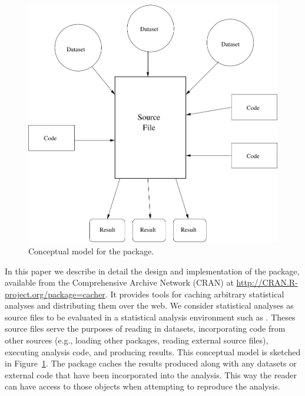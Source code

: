\documentclass[nojss]{jss}
\begin{document}
\begin{figure}[t!]
  \centering
\includegraphics[width=4.8in]{model}
\caption{Conceptual model for the  package.}
\label{model}
\end{figure}

In this paper we describe in detail the design and implementation of
the  package, available from the Comprehensive 
Archive Network (CRAN) at \url{http://CRAN.R-project.org/package=cacher}.
It provides tools for caching arbitrary
statistical analyses and distributing them over the web.  We consider
statistical analyses as source files to be evaluated in a statistical
analysis environment such as .  Theses source files serve
the purposes of reading in datasets, incorporating code from other
sources (e.g., loading other  packages, reading external
source files), executing analysis code, and producing results.  This
conceptual model is sketched in Figure~\ref{model}.
The  package caches the results produced along with any
datasets or external code that have been incorporated into the
analysis.  This way the reader can have access to those objects when
attempting to reproduce the analysis.
\end{document}
